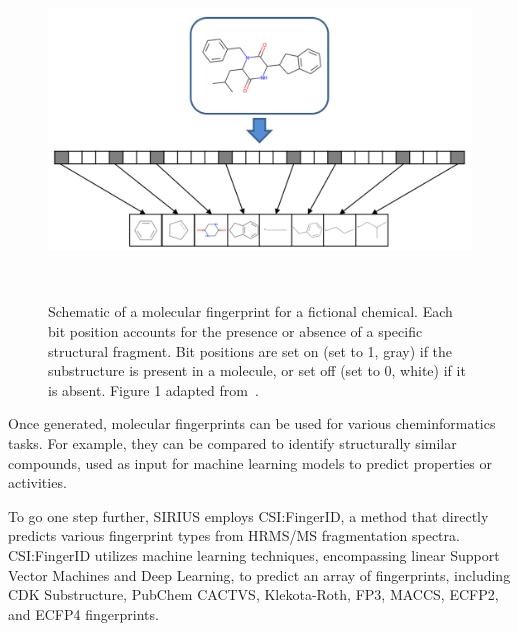 \begin{figure}
    \centering
    \includegraphics[width=1.0\textwidth]{figures/fingerprint_schema.png}  
    \caption{Schematic of a molecular fingerprint for a fictional chemical. Each bit position accounts for the presence or absence of a specific structural fragment. Bit positions are set on (set to 1, gray) if the substructure is present in a molecule, or set off (set to 0, white) if it is absent. Figure 1 adapted from~\cite{janela2022}.}
~\label{fig:fingerprint_schema} 
\end{figure}

Once generated, molecular fingerprints can be used for various cheminformatics tasks. For example, they can be compared to identify structurally similar compounds, used as input for machine learning models to predict properties or activities.

To go one step further, SIRIUS employs CSI:FingerID, a method that directly predicts various fingerprint types from HRMS/MS fragmentation spectra. CSI:FingerID utilizes machine learning techniques, encompassing linear Support Vector Machines and Deep Learning, to predict an array of fingerprints, including CDK Substructure, PubChem CACTVS, Klekota-Roth, FP3, MACCS, ECFP2, and ECFP4 fingerprints.

